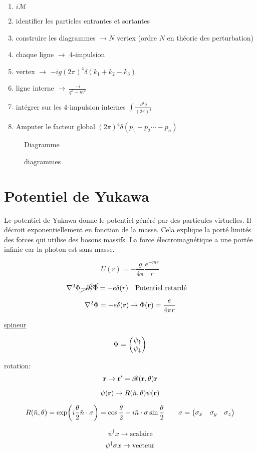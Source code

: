\begin{enumerate}
	\item $i \mathcal{M} $ 
	\item identifier les particles entrantes et sortantes
	\item construire les diagrammes $\to N$ vertex (ordre $N$ en théorie des perturbation) 
	\item chaque ligne $\to$ 4-impulsion 
	\item vertex $\to$ $-ig \left( 2\pi \right) ^4 \delta(k_1 + k_2 - k_3)$  
	\item ligne interne $\to \ \frac{-i}{q^2-m^{2}} $ 
	\item intégrer sur les 4-impulsion internes $\int \frac{\dd^{4}q  }{\left( 2\pi \right) ^4} $ 
	\item Amputer le facteur global $(2\pi)^4 \delta(p_1 +p_2 \dotsb -p_n)$ 
\end{enumerate}

\begin{figure}[ht]
    \centering
    \caption{Diagramme}
    \label{fig:diagramme}
\end{figure}


\begin{figure}[ht]
    \centering
    \caption{diagrammes}
    \label{fig:diagrammes}
\end{figure}
\clearpage

\section*{Potentiel de Yukawa}

Le potentiel de Yukawa donne le potentiel généré par des particules virtuelles. Il décroit exponentiellement en fonction de la masse. Cela explique la porté limités des forces qui utilise des bosons massifs. La force électromagnétique a une portée infinie car la photon est sans masse.

$$U(r) = - \frac{g}{4\pi} \frac{e^{-m r}}{r} $$ 

$$\nabla^{2}\Phi \cancel{-\partial_?^{?}\Phi} = -e \delta (r) \qq{Potentiel retardé}$$ 

$$\nabla^{2}\Phi = -e \delta(\vb{r}) \to \Phi (\vb{r}) = \frac{e}{4\pi{}r} $$ 

\underline{spineur} 

$$\Psi =\mqty(\psi_\uparrow\\\psi_\downarrow)$$ 

rotation:
$$\vb{r} \to \vb{r}'= \mathscr{R}(\vb{r}, \theta)\vb{r}$$ 

$$\psi (\vb{r}) \to R(\hat n, \theta)\psi(\vb{r})$$ 

$$R(\hat n, \theta ) = \exp(i \frac{\theta}{2} \hat n \cdot  \vb{\sigma}) = \cos \frac{\theta}{2} + i \hat n \cdot \vb{\sigma}\sin \frac{\theta}{2} \qquad \vb{\sigma} = \mqty(\sigma_x & \sigma_y & \sigma_z)$$ 

$$\psi^{\dagger}x \to \text{scalaire} $$ 
$$\psi^{\dagger} \vb{\sigma} x \to \text{vecteur} $$ 



